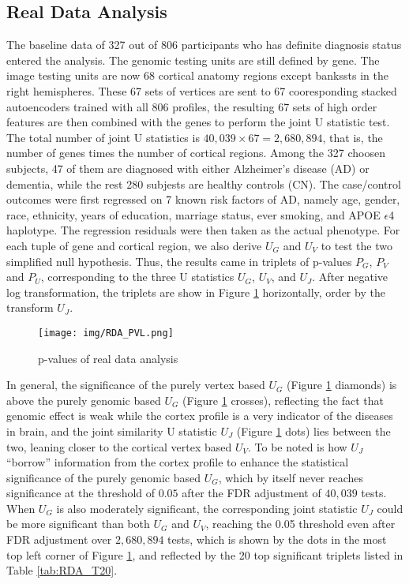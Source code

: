 \subsection{Real Data Analysis}
The baseline data of 327 out of 806 participants who has definite diagnosis status entered the analysis. The genomic testing units are still defined by gene. The image testing units are now 68 cortical anatomy regions except bankssts in the right hemispheres. These 67 sets of vertices are sent to 67 cooresponding stacked autoencoders trained with all 806 profiles, the resulting 67 sets of high order features are then combined with the genes to perform the joint U statistic test. The total number of joint U statistics is $40,039 \times 67 = 2,680,894$, that is, the number of genes times the number of cortical regions. Among the 327 choosen subjects, 47 of them are diagnosed with either Alzheimer's disease (AD) or dementia, while the rest 280 subjests are healthy controls (CN). The case/control outcomes were first regressed on 7 known risk factors of AD, namely age, gender, race, ethnicity, years of education, marriage status, ever smoking, and APOE $\epsilon$4 haplotype. The regression residuals were then taken as the actual phenotype. For each tuple of gene and cortical region, we also derive $U_G$ and $U_V$ to test the two simplified null hypothesis. Thus, the results came in triplets of p-values $P_G$, $P_V$ and $P_U$, corresponding to the three U statistics $U_G$, $U_V$, and $U_J$. After negative log transformation, the triplets are show in Figure \ref{fig:RDA_PVL} horizontally, order by the transform $U_J$.
\begin{figure}[!htbp]
\centering
\texttt{[image: img/RDA\_PVL.png]}
\caption{p-values of real data analysis}
\label{fig:RDA_PVL}
\end{figure}
In general, the significance of the purely vertex based $U_G$ (Figure \ref{fig:RDA_PVL} diamonds) is above the purely genomic based $U_G$ (Figure \ref{fig:RDA_PVL} crosses), reflecting the fact that genomic effect is weak while the cortex profile is a very indicator of the diseases in brain, and the joint similarity U statistic $U_J$ (Figure \ref{fig:RDA_PVL} dots) lies between the two, leaning closer to the cortical vertex based $U_V$. To be noted is how $U_J$ ``borrow'' information from the cortex profile to enhance the statistical significance of the purely genomic based $U_G$, which by itself never reaches significance at the threshold of $0.05$ after the FDR adjustment of $40,039$ tests. When $U_G$ is also moderately significant, the corresponding joint statistic $U_J$ could be more significant than both $U_G$ and $U_V$, reaching the 0.05 threshold even after FDR adjustment over $2,680,894$ tests, which is shown by the dots in the most top left corner of Figure \ref{fig:RDA_PVL}, and reflected by the 20 top significant triplets listed in Table \ref{tab:RDA_T20}.
